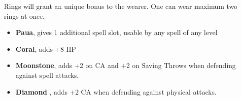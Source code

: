 
Rings will grant an unique bonus to the wearer. One can wear maximum two rings at once.
\begin{itemize}

    \item \textbf{Paua},  gives 1 additional spell slot, usable by any spell of any level

  \item \textbf{Coral}, adds +8 HP

  \item \textbf{Moonstone}, adds +2 on CA and +2 on Saving Throws when defending against spell attacks.

  \item \textbf{Diamond} , adds +2 CA when defending against physical attacks.

\end{itemize}
\pagebreak